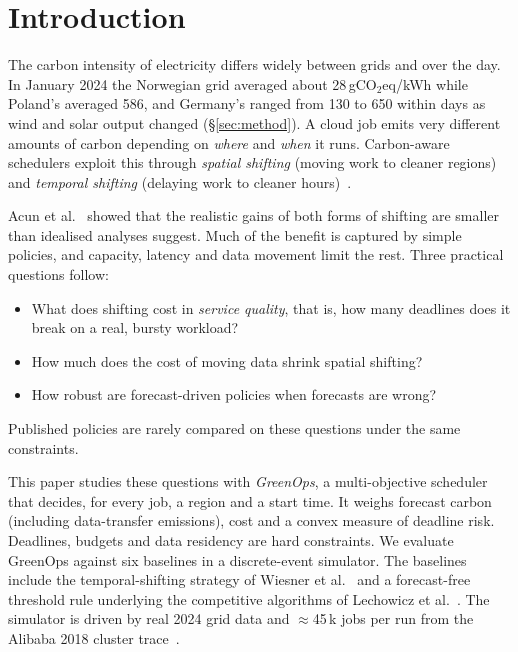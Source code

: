 \section{Introduction}
\label{sec:intro}

The carbon intensity of electricity differs widely between grids and
over the day. In January 2024 the Norwegian grid averaged about
28\,gCO$_2$eq/kWh while Poland's averaged 586, and Germany's ranged from
130 to 650 within days as wind and solar output changed
(\S\ref{sec:method}). A cloud job emits very different amounts of
carbon depending on \emph{where} and \emph{when} it runs. Carbon-aware
schedulers exploit this through \emph{spatial shifting} (moving work to
cleaner regions)~\cite{zhou2013carbon,gsteiger2024caribou} and
\emph{temporal shifting} (delaying work to cleaner
hours)~\cite{wiesner2021wait,radovanovic2023carbon}.

Acun et al.~\cite{acun2024limitations} showed that the realistic gains
of both forms of shifting are smaller than idealised analyses suggest.
Much of the benefit is captured by simple policies, and capacity,
latency and data movement limit the rest. Three practical questions
follow:
\begin{itemize}
\item What does shifting cost in \emph{service quality}, that is, how
  many deadlines does it break on a real, bursty workload?
\item How much does the cost of moving data shrink spatial shifting?
\item How robust are forecast-driven policies when forecasts are wrong?
\end{itemize}
Published policies are rarely compared on these questions under the
same constraints.

This paper studies these questions with \emph{GreenOps}, a
multi-objective scheduler that decides, for every job, a region and a
start time. It weighs forecast carbon (including data-transfer
emissions), cost and a convex measure of deadline risk. Deadlines,
budgets and data residency are hard constraints. We evaluate GreenOps
against six baselines in a discrete-event simulator. The baselines
include the temporal-shifting strategy of Wiesner et
al.~\cite{wiesner2021wait} and a forecast-free threshold rule underlying
the competitive algorithms of Lechowicz et al.~\cite{lechowicz2024soad}.
The simulator is driven by real 2024 grid data and $\approx$45\,k jobs
per run from the Alibaba 2018 cluster trace~\cite{guo2019alibaba}.

